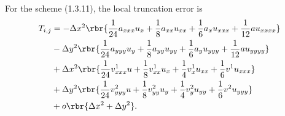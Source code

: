 \documentclass[english, nochinese]{pnote}
\begin{document}
For the scheme (1.3.11), the local truncation error is
\begin{equation}
\begin{split}
T_{ i, j } &= - \Delta x^2 \rbr{ \frac{1}{24} a_{ x x x } u_x + \frac{1}{8} a_{ x x } u_{ x x } + \frac{1}{6} a_x u_{ x x x } + \frac{1}{12} a u_{ x x x x } } \\
&- \Delta y^2 \rbr{ \frac{1}{24} a_{ y y y } u_y + \frac{1}{8} a_{ y y } u_{ y y } + \frac{1}{6} a_y u_{ y y y } + \frac{1}{12} a u_{ y y y y } } \\
&+ \Delta x^2 \rbr{ \frac{1}{24} v^1_{ x x x } u + \frac{1}{8} v^1_{ x x } u_x + \frac{1}{4} v^1_x u_{ x x } + \frac{1}{6} v^1 u_{ x x x } } \\
&+ \Delta y^2 \rbr{ \frac{1}{24} v^2_{ y y y } u + \frac{1}{8} v^2_{ y y } u_y + \frac{1}{4} v^2_y u_{ y y } + \frac{1}{6} v^2 u_{ y y y } } \\
&+ o \rbr{ \Delta x^2 + \Delta y^2 }.
\end{split}
\end{equation}
\end{document}
